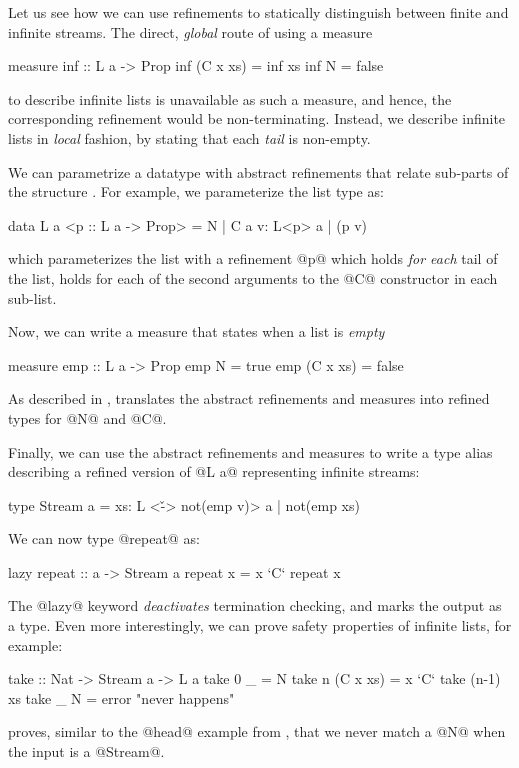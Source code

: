 Let us see how we can use refinements to statically 
distinguish between finite and infinite streams. 
The direct, \emph{global} route of using a measure
%
\begin{code}
  measure inf    :: L a -> Prop 
    inf (C x xs) = inf xs
    inf N        = false 
\end{code}
%
to describe infinite lists is unavailable as such 
a measure, and hence, the corresponding refinement
would be non-terminating.
%
Instead, we describe infinite lists in \emph{local} 
fashion, by stating that each \emph{tail} is non-empty.

We can parametrize a datatype with abstract 
refinements that relate sub-parts of the 
structure \cite{vazou13}. 
For example, we parameterize the list type as:
%
\begin{code}
  data L a <p :: L a -> Prop> 
    = N | C a {v: L<p> a | (p v)}
\end{code}
%
which parameterizes the list with a refinement 
@p@ which holds \emph{for each} tail of the list, 
\ie holds for each of the second arguments to 
the @C@ constructor in each sub-list.


 Now, we can write a measure that 
states when a list is \emph{empty}
%
\begin{code}
  measure emp  :: L a -> Prop 
    emp N        = true
    emp (C x xs) = false
\end{code}
%
As described in , \toolname translates the 
abstract refinements and measures into refined types for 
@N@ and @C@.

Finally, we can use the abstract refinements and measures to 
write a type alias describing a refined version of @L a@ 
representing infinite streams:
%
\begin{code}
  type Stream a = 
    {xs: L <{\v -> not(emp v)}> a | not(emp xs)}
\end{code}
%
We can now type @repeat@ as:
%
\begin{code}
  lazy repeat :: a -> Stream a
  repeat x    = x `C` repeat x 
\end{code}
%
The @lazy@ keyword \emph{deactivates} termination checking, and 
marks the output as a \Div type.
%
Even more interestingly, we can prove safety properties of 
infinite lists, for example:
%
\begin{code}
  take            :: Nat -> Stream a -> L a
  take 0 _        = N
  take n (C x xs) = x `C` take (n-1) xs
  take _ N        = error "never happens"
\end{code}
%
\toolname proves, similar to the @head@ example from
, that we never match a @N@ when 
the input is a @Stream@.

